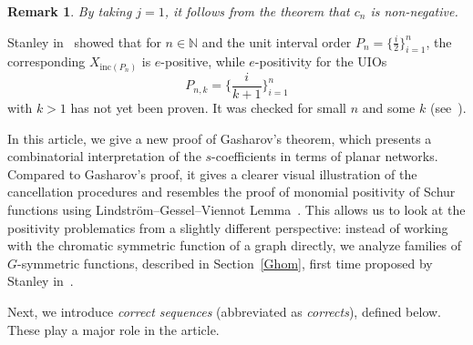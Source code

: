 \documentclass{article}
\theoremstyle{plain}
\newtheorem{remark}[thm]{Remark}
\theoremstyle{definition}
\begin{document}
\begin{remark}
By taking $j=1$, it follows from the theorem that $c_n$ is non-negative.
\end{remark}

Stanley in~\cite{Stanley95a} showed that for $n\in\mathbb{N}$ and the unit interval order $P_n=\{\frac{i}{2}\}_{i=1}^n$, the corresponding $X_{\text{inc}(P_n)}$ is $e$-positive, while $e$-positivity for the UIOs $$P_{n,k}=\bigg\{\frac{i}{k+1}\bigg\}_{i=1}^n$$ with $k>1$ has not yet been proven. It was checked for small $n$ and some $k$ (see~\cite{Stanley95a}).




In this article, we give a new proof of Gasharov's theorem, which
presents a combinatorial interpretation of the $s$-coefficients in terms
of planar networks. Compared to Gasharov's proof,
it gives a clearer visual
illustration of the cancellation procedures and resembles the proof of
monomial positivity of Schur functions using Lindström–Gessel–Viennot
Lemma~\cite{Fulmek10}. This allows us to look at the positivity
problematics from a slightly different perspective: instead of working with
the chromatic symmetric function of a graph directly, we analyze
families of $G$-symmetric functions, described in Section~\ref{Ghom}, first time proposed by Stanley in~\cite{Stanley95b}.

Next, we introduce {\em correct sequences} (abbreviated as {\em corrects}),
defined below. These play a major role in the article.
\end{document}
